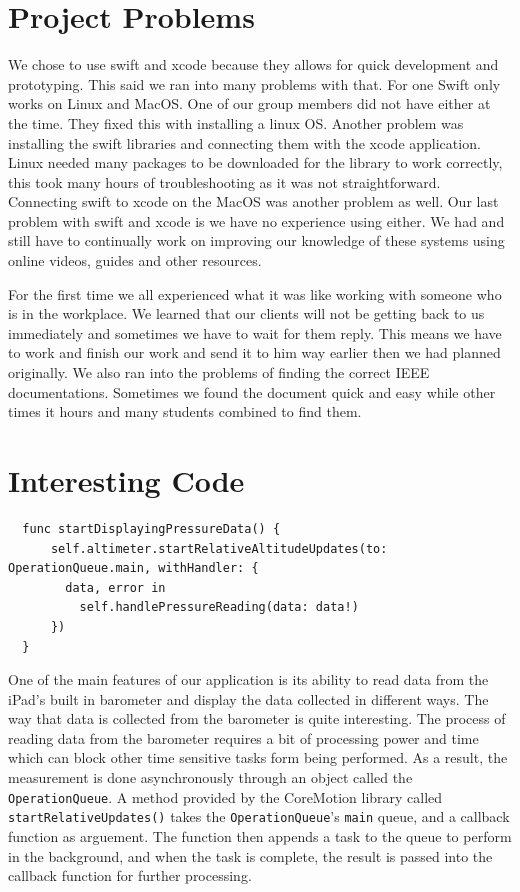 \documentclass[onecolumn, draftclsnofoot,10pt, compsoc]{IEEEtran}
\begin{document}
\section{Project Problems}
We chose to use swift and xcode because they allows for quick development and prototyping.
This said we ran into many problems with that. For one Swift only works on Linux and MacOS.
One of our group members did not have either at the time. They fixed this with installing a linux OS.
Another problem was installing the swift libraries and connecting them with the xcode application.
Linux needed many packages to be downloaded for the library to work correctly, this took many hours of troubleshooting as it was not straightforward.
Connecting swift to xcode on the MacOS was another problem as well.
Our last problem with swift and xcode is we have no experience using either.
We had and still have to continually work on improving our knowledge of these systems using online videos, guides and other resources.

For the first time we all experienced what it was like working with someone who is in the workplace.
We learned that our clients will not be getting back to us immediately and sometimes we have to wait for them reply.
This means we have to work and finish our work and send it to him way earlier then we had planned originally.
We also ran into the problems of finding the correct IEEE documentations.
Sometimes we found the document quick and easy while other times it hours and many students combined to find them.

\section{Interesting Code}
\begin{lstlisting}
  func startDisplayingPressureData() {
      self.altimeter.startRelativeAltitudeUpdates(to: OperationQueue.main, withHandler: {
        data, error in
          self.handlePressureReading(data: data!)
      })
  }

\end{lstlisting}

One of the main features of our application is its ability to read data from the iPad's built in barometer and display the data collected in different ways.
The way that data is collected from the barometer is quite interesting.
The process of reading data from the barometer requires a bit of processing power and time which can block other time sensitive tasks form being performed.
As a result, the measurement is done asynchronously through an object called the \texttt{OperationQueue}.
A method provided by the CoreMotion library called \texttt{startRelativeUpdates()} takes the \texttt{OperationQueue}'s \texttt{main} queue, and a callback function as arguement.
The function then appends a task to the queue to perform in the background, and when the task is complete, the result is passed into the callback function for further processing.\\
\end{document}
